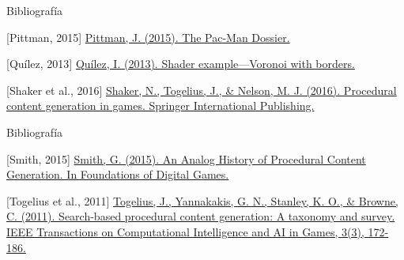 \documentclass{beamer}
\begin{document}
    \begin{frame}{Bibliografía \scriptsize{\hfill \secname}}
        \begin{thebibliography}{1}
        
    	
    	
    	[Pittman, 2015] \href{https://pacman.holenet.info/}{Pittman, J. (2015). The Pac-Man Dossier.}
        
    	
    	
    	[Quílez, 2013] \href{https://www.iquilezles.org/www/articles/voronoilines/voronoilines.htm}{Quílez, I. (2013). Shader example—Voronoi with borders.}
    	
    	
    	
    	[Shaker et al., 2016] \href{https://doi.org/10.1007/978-3-319-42716-4}{Shaker, N., Togelius, J., \& Nelson, M. J. (2016). Procedural content generation in games. Springer International Publishing.}
        
        \end{thebibliography}
    \end{frame}
    
    \begin{frame}{Bibliografía \scriptsize{\hfill \secname}}
        \begin{thebibliography}{1}
    	
    	
    	[Smith, 2015] \href{http://sokath.com/home/wp-content/uploads/2018/01/smith-fdg15.pdf}{Smith, G. (2015). An Analog History of Procedural Content Generation. In Foundations of Digital Games.}
    	
    	
    	
    	[Togelius et al., 2011] \href{https://doi.org/10.1109/TCIAIG.2011.2148116}{Togelius, J., Yannakakis, G. N., Stanley, K. O., \& Browne, C. (2011). Search-based procedural content generation: A taxonomy and survey. IEEE Transactions on Computational Intelligence and AI in Games, 3(3), 172-186.}
        
        \end{thebibliography}
    \end{frame}
\end{document}
